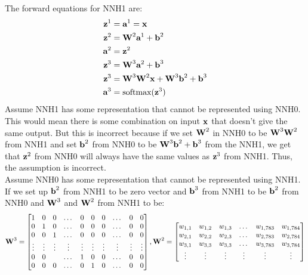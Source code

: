 \documentclass[10pt,a4paper]{article}
\begin{document}
\begin{enumerate}
\begin{enumerate}
The forward equations for NNH1 are:
\begin{align}
\textbf{\text{{z}}}^1 &= \textbf{\text{{a}}}^1 = \textbf{\text{{x}}} \label{eq:a1h}\\
\textbf{\text{{z}}}^2&=\textbf{\text{{W}}}^2\textbf{\text{{a}}}^1+\textbf{\text{{b}}}^2 \label{eq:z2h}\\
\textbf{\text{{a}}}^2 &= \textbf{\text{{z}}}^2 \label{eq:a2h}\\
\textbf{\text{{z}}}^3&=\textbf{\text{{W}}}^3\textbf{\text{{a}}}^2+\textbf{\text{{b}}}^3 \label{eq:z3h}\\
\textbf{\text{{z}}}^3 &= \textbf{\text{{W}}}^3\textbf{\text{{W}}}^2\textbf{\text{{x}}}+\textbf{\text{{W}}}^3\textbf{\text{{b}}}^2 + \textbf{\text{{b}}}^3 \label{eq:fullz3h}\\
\textbf{\text{{a}}}^3 &=\text{softmax}(\textbf{\text{{z}}}^3) \label{eq:a3h}
\end{align}
Assume NNH1 has some representation that cannot be represented using NNH0. This would mean there is some combination on input $\vect{x}$ that doesn't give the same output. But this is incorrect because if we set $\mat{W}^2$ in NNH0 to be $\mat{W}^3\mat{W}^2$ from NNH1 and set $\mat{b}^2$ from NNH0 to be $\mat{W}^3\vect{b}^2 + \vect{b}^3$ from the NNH1, we get that $\vect{z}^2$ from NNH0 will always have the same values as $\vect{z}^3$ from NNH1. Thus, the assumption is incorrect. \\
Assume NNH0 has some representation that cannot be represented using NNH1. If we set up $\vect{b}^2$ from NNH1 to be zero vector and $\vect{b}^3$ from NNH1 to be $\vect{b}^2$ from NNH0 and $\mat{W}^3$ and $\mat{W}^2$ from NNH1 to be:
$$\mat{W}^3= 
\begin{bmatrix}
    1 & 0 & 0 & \dots & 0 & 0 &0& \dots & 0 & 0\\
    0 & 1 & 0 & \dots & 0 & 0 &0& \dots & 0 & 0\\
    0 & 0 & 1 & \dots & 0 & 0 &0& \dots & 0 & 0\\
   \vdots & \vdots  & \vdots  & \vdots  & \vdots  & \vdots & \vdots& \vdots & \vdots& \vdots  \\
    0 & 0 &  & \dots & 1& 0  &0& \dots & 0 & 0\\
	0 & 0 & 0 & \dots & 0 & 1 &0  & \dots & 0 & 0\\             
\end{bmatrix}
,
\mat{W}^2= 
\begin{bmatrix}
    w_{1, 1} & w_{1, 2} & w_{1, 3} & \dots & w_{1, 783} & w_{1, 784} \\
    w_{2,1} & w_{2, 2} & w_{2, 3} & \dots & w_{2, 783} & w_{2, 784} \\
    w_{3,1} & w_{3, 3} & w_{3, 3} & \dots & w_{3, 783} & w_{3, 784} \\
   \vdots & \vdots  & \vdots  & \vdots  & \vdots  & \vdots  \\

\end{bmatrix}$$
\end{enumerate}
\end{enumerate}
\end{document}
